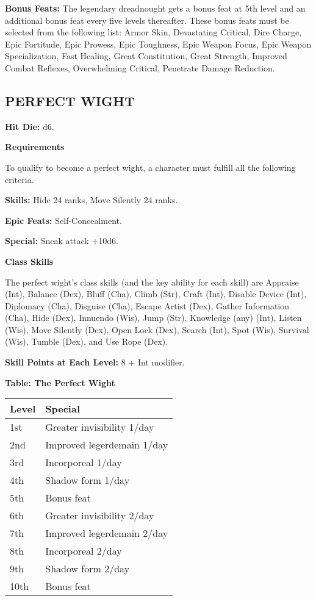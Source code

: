 \documentclass{article}
\begin{document}
\textbf{Bonus Feats:} The legendary dreadnought gets a bonus feat at 5th level 
and an additional bonus feat every five levels thereafter. These bonus feats must 
be selected from the following list: Armor Skin, Devastating Critical, Dire Charge, 
Epic Fortitude, Epic Prowess, Epic Toughness, Epic Weapon Focus, Epic Weapon Specialization, 
Fast Healing, Great Constitution, Great Strength, Improved Combat Reflexes, Overwhelming 
Critical, Penetrate Damage Reduction. 

\vspace{12pt}
\subsection*{{\LARGE{}PERFECT WIGHT }}

\textbf{Hit Die:} d6. 

\textbf{Requirements}

To qualify to become a perfect wight, a character must fulfill all the following 
criteria. 

\textbf{Skills:} Hide 24 ranks, Move Silently 24 ranks. 

\textbf{Epic Feats:} Self-Concealment. 

\textbf{Special:} Sneak attack +10d6. 

\textbf{Class Skills}

The perfect wight's class skills (and the key ability for each skill) are Appraise 
(Int), Balance (Dex), Bluff (Cha), Climb (Str), Craft (Int), Disable Device (Int), 
Diplomacy (Cha), Disguise (Cha), Escape Artist (Dex), Gather Information (Cha), 
Hide (Dex), Innuendo (Wis), Jump (Str), Knowledge (any) (Int), Listen (Wis), Move 
Silently (Dex), Open Lock (Dex), Search (Int), Spot (Wis), Survival (Wis), Tumble 
(Dex), and Use Rope (Dex). 

\textbf{Skill Points at Each Level:} 8 + Int modifier.

\vspace{12pt}
\textbf{Table: The Perfect Wight }

\begin{tabular}{|>{\raggedright}p{27pt}|>{\raggedright}p{121pt}|}
\hline
L\textbf{evel} & S\textbf{pecial }\tabularnewline
\hline
1st & Greater invisibility 1/day \tabularnewline
\hline
2nd & Improved legerdemain 1/day \tabularnewline
\hline
3rd & Incorporeal 1/day \tabularnewline
\hline
4th & Shadow form 1/day \tabularnewline
\hline
5th & Bonus feat \tabularnewline
\hline
6th & Greater invisibility 2/day \tabularnewline
\hline
7th & Improved legerdemain 2/day \tabularnewline
\hline
8th & Incorporeal 2/day \tabularnewline
\hline
9th & Shadow form 2/day \tabularnewline
\hline
10th & Bonus feat\tabularnewline
\hline
\end{tabular}
\end{document}
